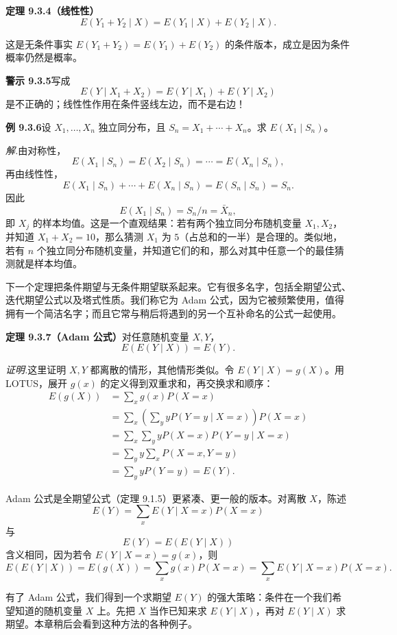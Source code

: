 \documentclass[UTF8,12pt,a4paper,fontset=fandol]{ctexart}
\begin{document}
\noindent\textbf{定理 9.3.4（线性性）}\quad
\[
  E(Y_1+Y_2\mid X)=E(Y_1\mid X)+E(Y_2\mid X).
\]

这是无条件事实 $E(Y_1+Y_2)=E(Y_1)+E(Y_2)$ 的条件版本，成立是因为条件概率仍然是概率。

\noindent\textbf{警示 9.3.5}\quad 写成
\[
  E(Y\mid X_1+X_2)=E(Y\mid X_1)+E(Y\mid X_2)
\]
是不正确的；线性性作用在条件竖线左边，而不是右边！

\noindent\textbf{例 9.3.6}\quad 设 $X_1,\ldots,X_n$ 独立同分布，且 $S_n=X_1+\cdots+X_n$。求 $E(X_1\mid S_n)$。

\noindent\textit{解.}\quad 由对称性，
\[
  E(X_1\mid S_n)=E(X_2\mid S_n)=\cdots=E(X_n\mid S_n),
\]
再由线性性，
\[
  E(X_1\mid S_n)+\cdots+E(X_n\mid S_n)=E(S_n\mid S_n)=S_n.
\]
因此
\[
  E(X_1\mid S_n)=S_n/n=\bar X_n,
\]
即 $X_j$ 的样本均值。这是一个直观结果：若有两个独立同分布随机变量 $X_1,X_2$，并知道 $X_1+X_2=10$，那么猜测 $X_1$ 为 $5$（占总和的一半）是合理的。类似地，若有 $n$ 个独立同分布随机变量，并知道它们的和，那么对其中任意一个的最佳猜测就是样本均值。

下一个定理把条件期望与无条件期望联系起来。它有很多名字，包括全期望公式、迭代期望公式以及塔式性质。我们称它为 Adam 公式，因为它被频繁使用，值得拥有一个简洁名字；而且它常与稍后将遇到的另一个互补命名的公式一起使用。

\noindent\textbf{定理 9.3.7（Adam 公式）}\quad 对任意随机变量 $X,Y$，
\[
  E(E(Y\mid X))=E(Y).
\]

\noindent\textit{证明.}\quad 这里证明 $X,Y$ 都离散的情形，其他情形类似。令 $E(Y\mid X)=g(X)$。用 LOTUS，展开 $g(x)$ 的定义得到双重求和，再交换求和顺序：
\[
\begin{aligned}
  E(g(X))
  &=\sum_x g(x)P(X=x)\\
  &=\sum_x\left(\sum_y yP(Y=y\mid X=x)\right)P(X=x)\\
  &=\sum_x\sum_y yP(X=x)P(Y=y\mid X=x)\\
  &=\sum_y y\sum_x P(X=x,Y=y)\\
  &=\sum_y yP(Y=y)=E(Y).
\end{aligned}
\]

Adam 公式是全期望公式（定理 9.1.5）更紧凑、更一般的版本。对离散 $X$，陈述
\[
  E(Y)=\sum_x E(Y\mid X=x)P(X=x)
\]
与
\[
  E(Y)=E(E(Y\mid X))
\]
含义相同，因为若令 $E(Y\mid X=x)=g(x)$，则
\[
  E(E(Y\mid X))=E(g(X))
  =\sum_x g(x)P(X=x)
  =\sum_x E(Y\mid X=x)P(X=x).
\]

有了 Adam 公式，我们得到一个求期望 $E(Y)$ 的强大策略：条件在一个我们希望知道的随机变量 $X$ 上。先把 $X$ 当作已知来求 $E(Y\mid X)$，再对 $E(Y\mid X)$ 求期望。本章稍后会看到这种方法的各种例子。
\end{document}

